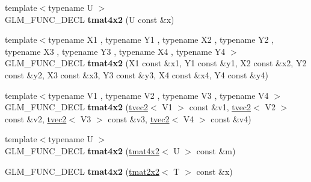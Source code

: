 \begin{DoxyCompactItemize}
\item 
\hypertarget{structglm_1_1detail_1_1tmat4x2_a8be40d60e581c88ab765a18c71090c63}{{\footnotesize template$<$typename U $>$ }\\\-G\-L\-M\-\_\-\-F\-U\-N\-C\-\_\-\-D\-E\-C\-L {\bfseries tmat4x2} (\-U const \&x)}\label{structglm_1_1detail_1_1tmat4x2_a8be40d60e581c88ab765a18c71090c63}

\item 
\hypertarget{structglm_1_1detail_1_1tmat4x2_ade64c9393252ddc8618f573c792db3ee}{{\footnotesize template$<$typename X1 , typename Y1 , typename X2 , typename Y2 , typename X3 , typename Y3 , typename X4 , typename Y4 $>$ }\\\-G\-L\-M\-\_\-\-F\-U\-N\-C\-\_\-\-D\-E\-C\-L {\bfseries tmat4x2} (\-X1 const \&x1, \-Y1 const \&y1, \-X2 const \&x2, \-Y2 const \&y2, \-X3 const \&x3, \-Y3 const \&y3, \-X4 const \&x4, \-Y4 const \&y4)}\label{structglm_1_1detail_1_1tmat4x2_ade64c9393252ddc8618f573c792db3ee}

\item 
\hypertarget{structglm_1_1detail_1_1tmat4x2_abd440da80430ebbf6926802de5677d2c}{{\footnotesize template$<$typename V1 , typename V2 , typename V3 , typename V4 $>$ }\\\-G\-L\-M\-\_\-\-F\-U\-N\-C\-\_\-\-D\-E\-C\-L {\bfseries tmat4x2} (\hyperlink{structglm_1_1detail_1_1tvec2}{tvec2}$<$ \-V1 $>$ const \&v1, \hyperlink{structglm_1_1detail_1_1tvec2}{tvec2}$<$ \-V2 $>$ const \&v2, \hyperlink{structglm_1_1detail_1_1tvec2}{tvec2}$<$ \-V3 $>$ const \&v3, \hyperlink{structglm_1_1detail_1_1tvec2}{tvec2}$<$ \-V4 $>$ const \&v4)}\label{structglm_1_1detail_1_1tmat4x2_abd440da80430ebbf6926802de5677d2c}

\item 
\hypertarget{structglm_1_1detail_1_1tmat4x2_a410520189e090aec0b69fc9d29a96fb4}{{\footnotesize template$<$typename U $>$ }\\\-G\-L\-M\-\_\-\-F\-U\-N\-C\-\_\-\-D\-E\-C\-L {\bfseries tmat4x2} (\hyperlink{structglm_1_1detail_1_1tmat4x2}{tmat4x2}$<$ \-U $>$ const \&m)}\label{structglm_1_1detail_1_1tmat4x2_a410520189e090aec0b69fc9d29a96fb4}

\item 
\hypertarget{structglm_1_1detail_1_1tmat4x2_a543de5cbaad18d435b26979899368666}{\-G\-L\-M\-\_\-\-F\-U\-N\-C\-\_\-\-D\-E\-C\-L {\bfseries tmat4x2} (\hyperlink{structglm_1_1detail_1_1tmat2x2}{tmat2x2}$<$ \-T $>$ const \&x)}\label{structglm_1_1detail_1_1tmat4x2_a543de5cbaad18d435b26979899368666}


\end{DoxyCompactItemize}
